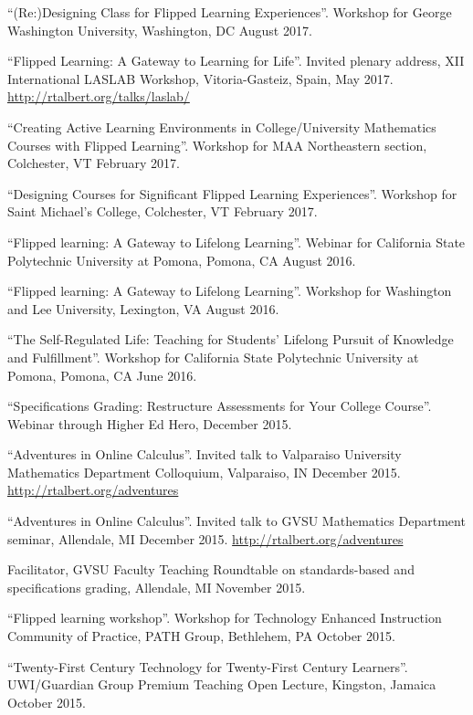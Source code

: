 \documentclass[letterpaper]{article}
\renewenvironment{itemize}{
  \begin{list}{}{
    \setlength{\leftmargin}{1.5em}
	\setlength{\itemsep}{0in}
  }
}{
  \end{list}
}
\begin{document}
\begin{itemize}
	\item ``(Re:)Designing Class for Flipped Learning Experiences''. Workshop for George Washington University, Washington, DC August 2017. 
	\item ``Flipped Learning: A Gateway to Learning for Life''. Invited plenary address, XII International LASLAB Workshop, Vitoria-Gasteiz, Spain, May 2017. \url{http://rtalbert.org/talks/laslab/}
	\item ``Creating Active Learning Environments in College/University Mathematics Courses with Flipped Learning''. Workshop for MAA Northeastern section, Colchester, VT February 2017.
	\item ``Designing Courses for Significant Flipped Learning Experiences''. Workshop for Saint Michael's College, Colchester, VT February 2017.
	\item ``Flipped learning: A Gateway to Lifelong Learning''. Webinar for California State Polytechnic University at Pomona, Pomona, CA August 2016.
	\item ``Flipped learning: A Gateway to Lifelong Learning''. Workshop for Washington and Lee University, Lexington, VA August 2016. 
	\item ``The Self-Regulated Life: Teaching for Students' Lifelong Pursuit of Knowledge and Fulfillment''. Workshop for California State Polytechnic University at Pomona, Pomona, CA June 2016. 
	\item ``Specifications Grading: Restructure Assessments for Your College Course''. Webinar through Higher Ed Hero, December 2015. 
	\item ``Adventures in Online Calculus''. Invited talk to Valparaiso University Mathematics Department Colloquium, Valparaiso, IN December 2015. \url{http://rtalbert.org/adventures}
	\item ``Adventures in Online Calculus''. Invited talk to GVSU Mathematics Department seminar, Allendale, MI December 2015. \url{http://rtalbert.org/adventures}
	\item Facilitator, GVSU Faculty Teaching Roundtable on standards-based and specifications grading, Allendale, MI November 2015. 
	\item ``Flipped learning workshop''. Workshop for Technology Enhanced Instruction Community of Practice, PATH Group, Bethlehem, PA October 2015. 
	\item ``Twenty-First Century Technology for Twenty-First Century Learners''. UWI/Guardian Group Premium Teaching Open Lecture, Kingston, Jamaica October 2015. 

\end{itemize}
\end{document}
